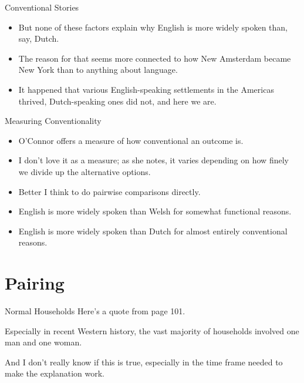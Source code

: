 \documentclass[
  ignorenonframetext,
]{beamer}
\providecommand{\tightlist}{%
  \setlength{\itemsep}{0pt}\setlength{\parskip}{0pt}}
\renewenvironment*{quote}	
	{\list{}{\rightmargin   \leftmargin} \item } 	
	{\endlist }
\begin{document}
\begin{frame}{Conventional Stories}
\protect\hypertarget{conventional-stories}{}
\begin{itemize}
\tightlist
\item
  But none of these factors explain why English is more widely spoken
  than, say, Dutch.
\item
  The reason for that seems more connected to how New Amsterdam became
  New York than to anything about language.
\item
  It happened that various English-speaking settlements in the Americas
  thrived, Dutch-speaking ones did not, and here we are.
\end{itemize}
\end{frame}

\begin{frame}{Measuring Conventionality}
\protect\hypertarget{measuring-conventionality}{}
\begin{itemize}
\tightlist
\item
  O'Connor offers a measure of how conventional an outcome is.
\item
  I don't love it as a measure; as she notes, it varies depending on how
  finely we divide up the alternative options.
\item
  Better I think to do pairwise comparisons directly.
\item
  English is more widely spoken than Welsh for somewhat functional
  reasons.
\item
  English is more widely spoken than Dutch for almost entirely
  conventional reasons.
\end{itemize}
\end{frame}

\hypertarget{pairing}{%
\section{Pairing}\label{pairing}}

\begin{frame}{Normal Households}
\protect\hypertarget{normal-households}{}
Here's a quote from page 101.

\begin{quote}
Especially in recent Western history, the vast majority of households
involved one man and one woman.
\end{quote}

And I don't really know if this is true, especially in the time frame
needed to make the explanation work.
\end{frame}
\end{document}
